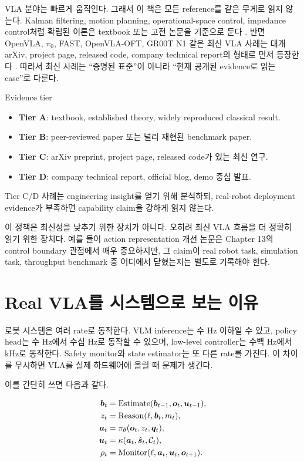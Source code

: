 VLA 분야는 빠르게 움직인다. 그래서 이 책은 모든 reference를 같은 무게로 읽지 않는다. Kalman filtering, motion planning, operational-space control, impedance control처럼 확립된 이론은 textbook 또는 고전 논문을 기준으로 둔다 \cite{kalman1960,khatib1987,hogan1985,lavalle2006}. 반면 OpenVLA, $\pi_0$, FAST, OpenVLA-OFT, GR00T N1 같은 최신 VLA 사례는 대개 arXiv, project page, released code, company technical report의 형태로 먼저 등장한다 \cite{openvla2024,pi02024,fast2025,openvlaoft2025,grootn12025}. 따라서 최신 사례는 ``증명된 표준''이 아니라 ``현재 공개된 evidence로 읽는 case''로 다룬다.

\begin{definitionbox}{Evidence tier}
\begin{itemize}
  \item \textbf{Tier A}: textbook, established theory, widely reproduced classical result.
  \item \textbf{Tier B}: peer-reviewed paper 또는 널리 재현된 benchmark paper.
  \item \textbf{Tier C}: arXiv preprint, project page, released code가 있는 최신 연구.
  \item \textbf{Tier D}: company technical report, official blog, demo 중심 발표.
\end{itemize}
Tier C/D 사례는 engineering insight를 얻기 위해 분석하되, real-robot deployment evidence가 부족하면 capability claim을 강하게 읽지 않는다.
\end{definitionbox}

이 정책은 최신성을 낮추기 위한 장치가 아니다. 오히려 최신 VLA 흐름을 더 정확히 읽기 위한 장치다. 예를 들어 action representation 개선 논문은 Chapter 13의 control boundary 관점에서 매우 중요하지만, 그 claim이 real robot task, simulation task, throughput benchmark 중 어디에서 닫혔는지는 별도로 기록해야 한다.

\section{Real VLA를 시스템으로 보는 이유}

로봇 시스템은 여러 rate로 동작한다. VLM inference는 수 Hz 이하일 수 있고, policy head는 수 Hz에서 수십 Hz로 동작할 수 있으며, low-level controller는 수백 Hz에서 kHz로 동작한다. Safety monitor와 state estimator는 또 다른 rate를 가진다. 이 차이를 무시하면 VLA를 실제 하드웨어에 올릴 때 문제가 생긴다.

이를 간단히 쓰면 다음과 같다.

\begin{align}
  \bm{b}_t &= \mathrm{Estimate}(\bm{b}_{t-1}, \bm{o}_t, \bm{u}_{t-1}), \\
  z_t &= \mathrm{Reason}(\ell, \bm{b}_t, m_t), \\
  \bm{a}_t &= \pi_\theta(\bm{o}_t, z_t, \bm{q}_t), \\
  \bm{u}_t &= \kappa(\bm{a}_t, \hat{\bm{s}}_t, \mathcal{C}_t), \\
  \rho_t &= \mathrm{Monitor}(\ell, \bm{a}_t, \bm{u}_t, \bm{o}_{t+1}).
  \label{eq:ch0-runtime-loop}
\end{align}

